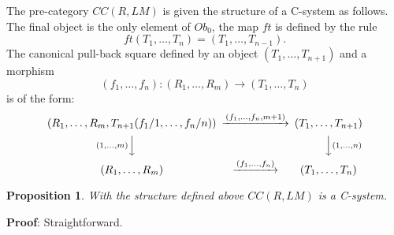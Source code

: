 \documentclass[11pt]{article}
\newenvironment{eq}{\begin{equation}}{\end{equation}}
\newenvironment{proof}{{\bf Proof}:}{\vskip 5mm }
\newtheorem{proposition}{Proposition}[subsection]
\newcommand{\llabel}[1]{\label{#1}}
\newcommand{\sr}{\rightarrow}
\begin{document}
The pre-category $CC(R,LM)$ is given the structure of a C-system as follows. The final object is the only element of $Ob_0$, the map $ft$ is defined by the rule
%
$$ft(T_1,\dots,T_n)=(T_1,\dots,T_{n-1}).$$
%
The canonical pull-back square defined by an object $(T_1,\dots,T_{n+1})$ and a morphism 
%
$$(f_1,\dots,f_{n}):(R_1,\dots,R_m)\sr (T_1,\dots,T_{n})$$
%
is of the form:
%
\begin{eq}
\label{2009.11.05.oldeq1}
\begin{CD}
(R_1,\dots,R_m,T_{n+1}(f_1/1,\dots, f_{n}/n)) @>(f_1,\dots,f_{n},m+1)>> (T_1,\dots,T_{n+1})\\
@V(1,\dots,m)VV @VV(1,\dots,n)V\\
(R_1,\dots,R_m) @>(f_1,\dots,f_{n})>> (T_1,\dots,T_{n})
\end{CD}
\end{eq}
%
%
\begin{proposition}
\llabel{2009.10.01.prop2}
With the structure defined above $CC(R,LM)$ is a C-system.
\end{proposition}
%
\begin{proof}
Straightforward.
\end{proof}
%
%
\end{document}
